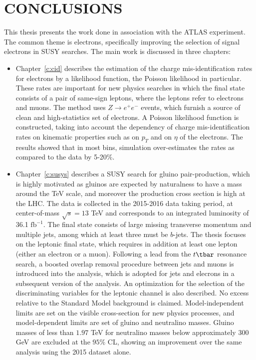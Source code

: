 \chapter{CONCLUSIONS}\label{c:con}


This thesis presents the work done in association with the ATLAS experiment.
The common theme is electrons, specifically improving the selection of signal
electrons in SUSY searches. The main work is discussed in three chapters:

\begin{itemize}[label=]

	\item Chapter~\ref{c:cid} describes the estimation of the charge
	      mis-identification rates for electrons by a likelihood function, the Poisson
	      likelihood in particular. These rates are important for new physics searches in
	      which the final state consists of a pair of same-sign leptons, where the
	      leptons refer to electrons and muons. The method uses $Z\to e^+e^-$ events,
	      which furnish a source of clean and high-statistics set of electrons. A Poisson
	      likelihood function is constructed, taking into account the dependency of
	      charge mis-identification rates on kinematic properties such as on $p_T$ and on
	      $\eta$ of the electrons. The results showed that in most bins, simulation
	      over-estimates the rates as compared to the data by 5-20$\%$.

	\item Chapter~\ref{c:susys} describes a SUSY search for gluino pair-production,
	      which is highly motivated as gluinos are expected by naturalness to have a mass
	      around the TeV scale, and moreover the production cross section is high at the
	      LHC. The data is collected in the 2015-2016 data taking period, at
	      center-of-mass $\sqrt{s} = 13$ TeV and corresponds to an integrated luminosity
	      of 36.1 $\text{fb}^{-1}$. The final state consists of large missing transverse
	      momentum and multiple jets, among which at least three must be $b$-jets. The
	      thesis focuses on the leptonic final state, which requires in addition at least
	      one lepton (either an electron or a muon). Following a lead from the $t\tbar$
	      resonance search, a boosted overlap removal procedure between jets and muons is
	      introduced into the analysis, which is adopted for jets and elecrons in a
	      subsequent version of the analysis. An optimization for the selection of the
	      discriminating variables for the leptonic channel is also described. No excess
	      relative to the Standard Model background is claimed. Model-independent limits
	      are set on the visible cross-section for new physics processes, and
	      model-dependent limits are set of gluino and neutralino masses. Gluino masses
	      of less than $1.97$ TeV for neutralino masses below approximately $300$ GeV are
	      excluded at the $95\%$ CL, showing an improvement over the same analysis using
	      the 2015 dataset alone.



\end{itemize}
